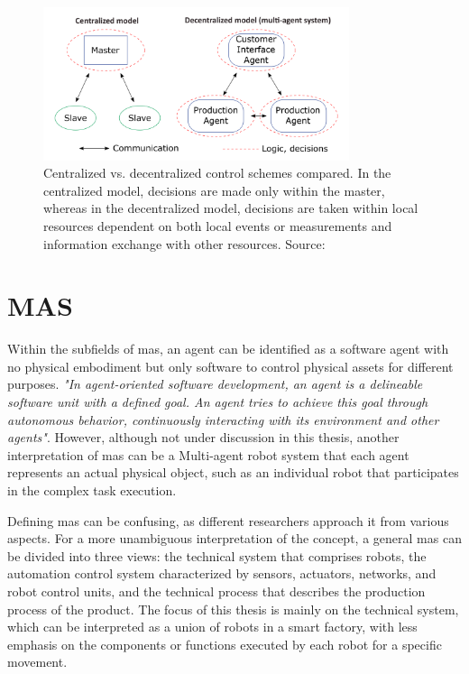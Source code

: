\begin{figure}[htb]
    \centering
    \includegraphics[width=0.8\textwidth]{figures/State-of-the-art/CentralizeDecentralizeConcept.png}

    \caption{Centralized vs. decentralized control schemes compared. 
    In the centralized model, decisions are made only within the 
    master, whereas in the decentralized model, decisions are taken 
    within local resources dependent on both local events or measurements 
    and information exchange with other resources. 
    Source: \cite[fig.1]{egger_deployment-friendly_2020}\label{fig: CentralizeDecentralizeConcept}}
\end{figure}



\section{MAS}

Within the subfields of \gls{mas}, an agent can be identified as a 
software agent with no physical embodiment but only software to control 
physical assets for different purposes. \textit{"In agent-oriented software 
development, an agent is a delineable software unit with a defined goal. 
An agent tries to achieve this goal through autonomous behavior, 
continuously interacting with its environment and other agents"}\cite{wagner_agentenunterstutztes_2008}. 
However, although not under discussion in this thesis, another 
interpretation of \gls{mas} can be a Multi-agent robot system that 
each agent represents an actual physical object, such as an individual 
robot that participates in the complex task execution\cite{ota_multi-agent_2006}.   


Defining \gls{mas} can be confusing, as different researchers approach 
it from various aspects. For a more unambiguous interpretation of the 
concept, a general \gls{mas} can be divided into three views: the 
technical system that comprises robots, the automation control system 
characterized by sensors, actuators, networks, and robot control units, 
and the technical process that describes the production process of the 
product\cite{lauber_prozessautomatisierung_1999}\cite{wannagat_agent_nodate}. 
The focus of this thesis is mainly on the technical system, which can 
be interpreted as a union of robots in a smart factory, with less 
emphasis on the components or functions executed by each robot for 
a specific movement.

